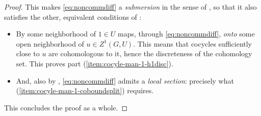 \documentclass[11pt]{article}
\numberwithin{equation}{section}
\numberwithin{equation}{section}
\begin{document}
\begin{proof}
 This makes \eqref{eq:noncommdiff} a {\it submersion} in the sense of \cite[Section~5.9.1\,(i)]{bourb-vars-17}, so that it also satisfies the other, equivalent conditions of \cite[Section~5.9.1]{bourb-vars-17}:
 \begin{itemize}\itemsep=0pt
 \item By \cite[Section~5.9.1\,(iv)]{bourb-vars-17} some neighborhood of $1\in U$ maps, through \eqref{eq:noncommdiff}, {\it onto} some open neighborhood of $u\in Z^1(G,U)$. This means that cocycles sufficiently close to $u$ are cohomologous to it, hence the discreteness of the cohomology set. This proves part (\ref{item:cocyle-man-1-h1disc}).
 \item And, also by \cite[Section~5.9.1\,(iv)]{bourb-vars-17}, \eqref{eq:noncommdiff} admits a {\it local section}: precisely what (\ref{item:cocyle-man-1-coboundsplit}) requires.
 \end{itemize}
 This concludes the proof as a whole.
\end{proof}
\end{document}
